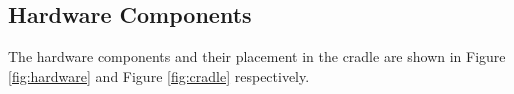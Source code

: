 \documentclass[12pt,a4paper]{report}
\begin{document}


\subsection{Hardware Components}
The hardware components and their placement in the cradle are shown in Figure \ref{fig:hardware} and Figure \ref{fig:cradle} respectively.
\end{document}
